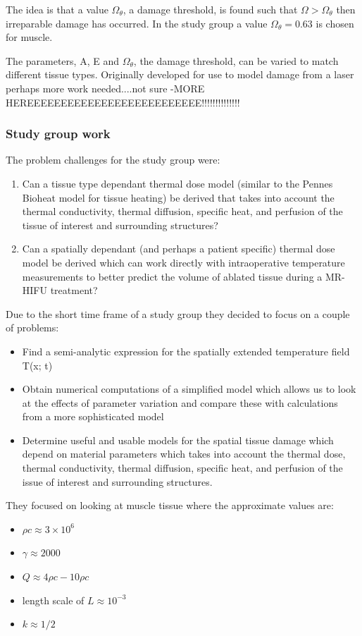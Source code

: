 \documentclass[11pt]{article} %
\begin{document}
		The idea is that a value $\Omega_\theta$, a damage threshold, is found such that $\Omega>\Omega_\theta$ then irreparable damage has occurred. In the study group a value $\Omega_\theta=0.63$ is chosen for muscle. 
		
		
	 	The parameters, A, E and $\Omega_\theta$, the damage threshold, can be varied to match different tissue types. Originally developed for use to model damage from a laser perhaps more work needed....not sure -MORE HEREEEEEEEEEEEEEEEEEEEEEEEEEE!!!!!!!!!!!!!!
	 	
	 	
	 	\subsubsection{Study group work}
	 	The problem challenges for the study group were: 
	 	\begin{enumerate}
	 		\item Can a tissue type dependant thermal dose model (similar to the Pennes Bioheat model for tissue heating) be derived that takes into account the thermal conductivity, thermal diffusion, specific heat, and perfusion of the tissue of interest and surrounding structures?
	 	\item 	Can a spatially dependant (and perhaps a patient specific) thermal dose model be derived which can work directly with intraoperative temperature measurements to better predict the volume of ablated tissue during a MR-HIFU treatment?
	 	\end{enumerate}
	 	
	 	Due to the short time frame of a study group they decided to focus on a couple of problems: 
	 	
	 	\begin{itemize}
	 		\item Find a semi-analytic expression for the spatially extended
	 	temperature field T(x; t)
	 	\item Obtain numerical computations of a simplified model which
	 	allows us to look at the effects of parameter variation and
	 	compare these with calculations from a more sophisticated
	 	model
	 	\item Determine useful and usable models for the spatial tissue
	 	damage which depend on material parameters which takes
	 	into account the thermal dose, thermal conductivity, thermal
	 	diffusion, specific heat, and perfusion of the issue of interest
	 	and surrounding structures.
	 	\end{itemize}
	 	They focused on looking at muscle tissue where the approximate values are:
	 	\begin{itemize}
	 		\item $\rho c \approx 3 \times 10^6$
	 		\item $\gamma \approx 2000$
	 		\item $Q \approx 4\rho c-10 \rho c$
	 		\item length scale of $L \approx 10^{-3}$
	 		\item $k \approx 1/2$
	 	\end{itemize}
 	
\end{document}
